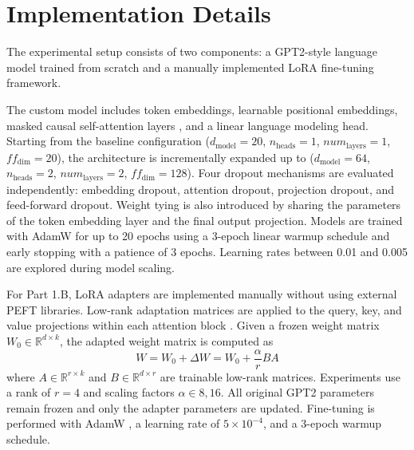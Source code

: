 \section{Implementation Details}
The experimental setup consists of two components: a GPT2-style language model trained from scratch and a manually implemented LoRA fine-tuning framework.

The custom model includes token embeddings, learnable positional embeddings, masked causal self-attention layers \cite{vaswani2017attention}, and a linear language modeling head. Starting from the baseline configuration ($d_{\text{model}}=20$, $n_{\text{heads}}=1$, $num_{\text{layers}}=1$, $ff_{\text{dim}}=20$), the architecture is incrementally expanded up to ($d_{\text{model}}=64$, $n_{\text{heads}}=2$, $num_{\text{layers}}=2$, $ff_{\text{dim}}=128$). Four dropout mechanisms \cite{srivastava2014dropout} are evaluated independently: embedding dropout, attention dropout, projection dropout, and feed-forward dropout. Weight tying \cite{press2016using} is also introduced by sharing the parameters of the token embedding layer and the final output projection. Models are trained with AdamW \cite{loshchilov2017decoupled} for up to 20 epochs using a 3-epoch linear warmup schedule and early stopping with a patience of 3 epochs. Learning rates between 0.01 and 0.005 are explored during model scaling.

For Part 1.B, LoRA adapters \cite{hu2021lora} are implemented manually without using external PEFT libraries. Low-rank adaptation matrices are applied to the query, key, and value projections within each attention block \cite{vaswani2017attention}. Given a frozen weight matrix $W_0 \in \mathbb{R}^{d \times k}$, the adapted weight matrix is computed as
\begin{equation}
W = W_0 + \Delta W = W_0 + \frac{\alpha}{r}BA
\end{equation}
where $A \in \mathbb{R}^{r \times k}$ and $B \in \mathbb{R}^{d \times r}$ are trainable low-rank matrices. Experiments use a rank of $r=4$ and scaling factors $\alpha \in {8,16}$. All original GPT2 parameters remain frozen and only the adapter parameters are updated. Fine-tuning is performed with AdamW \cite{loshchilov2017decoupled}, a learning rate of $5\times10^{-4}$, and a 3-epoch warmup schedule.
